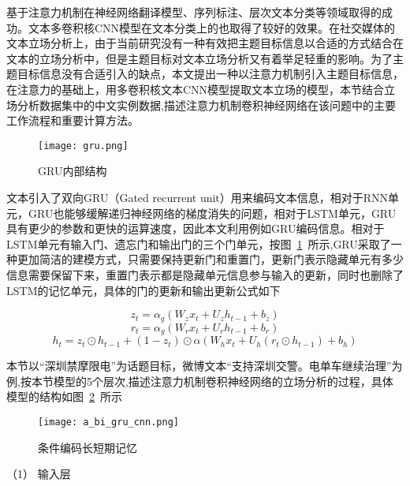 基于注意力机制在神经网络翻译模型、序列标注、层次文本分类等领域取得的成功。文本多卷积核CNN模型在文本分类上的也取得了较好的效果。在社交媒体的文本立场分析上，由于当前研究没有一种有效把主题目标信息以合适的方式结合在文本的立场分析中，但是主题目标对文本立场分析又有着举足轻重的影响。为了主题目标信息没有合适引入的缺点，本文提出一种以注意力机制引入主题目标信息，在注意力的基础上，用多卷积核文本CNN模型提取文本立场的模型，本节结合立场分析数据集中的中文实例数据,描述注意力机制卷积神经网络在该问题中的主要工作流程和重要计算方法。
\begin{figure}[htbp]
	\centering
	\texttt{[image: gru.png]}
	\caption[rnn_vanish]{GRU内部结构}
	\label{gru}
\end{figure}
文本引入了双向GRU（Gated recurrent unit）用来编码文本信息，相对于RNN单元，GRU也能够缓解递归神经网络的梯度消失的问题，相对于LSTM单元，GRU具有更少的参数和更快的运算速度，因此本文利用例如GRU编码信息。相对于LSTM单元有输入门、遗忘门和输出门的三个门单元，按图~\ref{gru}~所示,GRU采取了一种更加简洁的建模方式，只需要保持更新门和重置门，更新门表示隐藏单元有多少信息需要保留下来，重置门表示都是隐藏单元信息参与输入的更新，同时也删除了LSTM的记忆单元，具体的门的更新和输出更新公式如下

\begin{equation}\label{conv1} z_t=\alpha_g(W_zx_t+U_zh_{t-1}+b_z) \end{equation}
\begin{equation}\label{conv1} r_t=\alpha_g(W_rx_t+U_rh_{t-1}+b_r) \end{equation}
\begin{equation}\label{conv1} h_t=z_t\odot h_{t-1} + (1-z_t)\odot \alpha(W_hx_t+U_h(r_t\odot h_{t-1})+b_h) \end{equation}



本节以“深圳禁摩限电”为话题目标，微博文本“支持深圳交警。电单车继续治理”为例,按本节模型的5个层次,描述注意力机制卷积神经网络的立场分析的过程，具体模型的结构如图~\ref{GRU_CNN}~所示

\begin{figure}[htbp]
	\centering
	\texttt{[image: a\_bi\_gru\_cnn.png]}
	\caption[]{条件编码长短期记忆}
	\label{GRU_CNN}
\end{figure}

（1） 输入层

